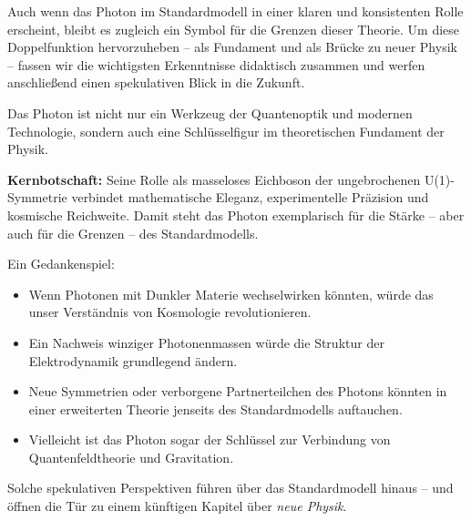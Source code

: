 Auch wenn das Photon im Standardmodell in einer klaren und konsistenten Rolle erscheint, 
bleibt es zugleich ein Symbol für die Grenzen dieser Theorie.  
Um diese Doppelfunktion hervorzuheben – als Fundament und als Brücke zu neuer Physik – 
fassen wir die wichtigsten Erkenntnisse didaktisch zusammen und werfen anschließend 
einen spekulativen Blick in die Zukunft.
\medskip
\begin{tcolorbox}[didaktikbox, title=Didaktischer Abschluss: Das Photon im Standardmodell]
	\label{box:didaktik_kapVIII}
	Das Photon ist nicht nur ein Werkzeug der Quantenoptik und modernen Technologie, 
	sondern auch eine Schlüsselfigur im theoretischen Fundament der Physik.  
	
	\medskip
	\textbf{Kernbotschaft:}  
	Seine Rolle als masseloses Eichboson der ungebrochenen U(1)-Symmetrie verbindet mathematische Eleganz, 
	experimentelle Präzision und kosmische Reichweite.  
	Damit steht das Photon exemplarisch für die Stärke – aber auch für die Grenzen – des Standardmodells.
\end{tcolorbox}
\medskip
\begin{tcolorbox}[hypobox, title={Was wäre, wenn das Standardmodell nur ein Zwischenschritt wäre?}]
	\label{Merksatz zum Photon}
	Ein Gedankenspiel:
	\begin{itemize}
		\item Wenn Photonen mit Dunkler Materie wechselwirken könnten, würde das unser Verständnis von Kosmologie revolutionieren.  
		\item Ein Nachweis winziger Photonenmassen würde die Struktur der Elektrodynamik grundlegend ändern.  
		\item Neue Symmetrien oder verborgene Partnerteilchen des Photons könnten in einer erweiterten Theorie jenseits des Standardmodells auftauchen.  
		\item Vielleicht ist das Photon sogar der Schlüssel zur Verbindung von Quantenfeldtheorie und Gravitation.  
	\end{itemize}
	
	\medskip
	Solche spekulativen Perspektiven führen über das Standardmodell hinaus – und öffnen die Tür 
	zu einem künftigen Kapitel über \emph{neue Physik}.
\end{tcolorbox}
